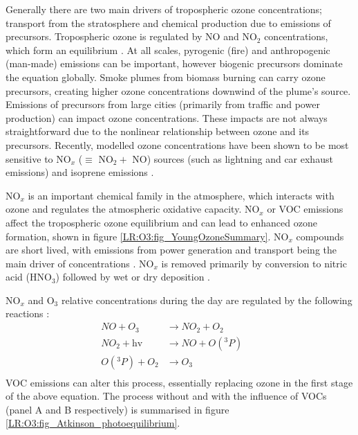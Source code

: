     Generally there are two main drivers of tropospheric ozone concentrations; transport from the stratosphere and chemical production due to emissions of precursors. 
    Tropospheric ozone is regulated by NO and NO$_2$ concentrations, which form an equilibrium \parencite{Cape2008,Young2018}.
    At all scales, pyrogenic (fire) and anthropogenic (man-made) emissions can be important, however biogenic precursors dominate the equation globally.
    Smoke plumes from biomass burning can carry ozone precursors, creating higher ozone concentrations downwind of the plume's source.
    Emissions of precursors from large cities (primarily from traffic and power production) can impact ozone concentrations.
    These impacts are not always straightforward due to the nonlinear relationship between ozone and its precursors.
    Recently, modelled ozone concentrations have been shown to be most sensitive to NO$_x$ ($\equiv $ NO$_2 +$ NO) sources (such as lightning and car exhaust emissions) and isoprene emissions \parencite{Christian2018}.
    
    NO$_x$ is an important chemical family in the atmosphere, which interacts with ozone and regulates the atmospheric oxidative capacity.
    NO$_x$ or VOC emissions affect the tropospheric ozone equilibrium and can lead to enhanced ozone formation, shown in figure \ref{LR:O3:fig_YoungOzoneSummary}.
    NO$_x$ compounds are short lived, with emissions from power generation and transport being the main driver of concentrations \parencite{Delmas1997}.
    NO$_x$ is removed primarily by conversion to nitric acid (HNO$_3$) followed by wet or dry deposition \parencite{Ayers2006}.
    
    NO$_x$ and O$_3$ relative concentrations during the day are regulated by the following reactions \parencite{Sillman1999,Atkinson2000}:
    \begin{equation}
      \begin{aligned}
        NO + O_3         & \to NO_2 + O_2      && \\%
        NO_2 + \text{hv} & \to NO + O({}^3P)   && \\%
        O({}^3P) + O_2   & \to O_3 			 && \\%
      \end{aligned}
      \label{LR:Atmos:Chem:eqn_NOandO3}
    \end{equation}
    VOC emissions can alter this process, essentially replacing ozone in the first stage of the above equation.
    The process without and with the influence of VOCs (panel A and B respectively) is summarised in figure \ref{LR:O3:fig_Atkinson_photoequilibrium}.
    
